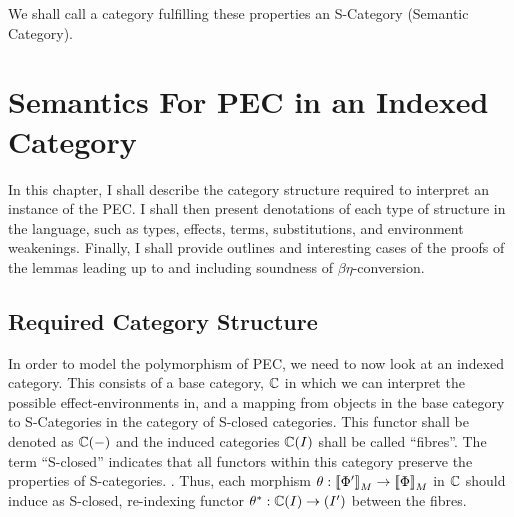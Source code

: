 \documentclass{Report}
\begin{document}
\qquad%

We shall call a category fulfilling these properties an S-Category (Semantic Category).


\chapter{Semantics For PEC in an Indexed Category}
In this chapter, I shall describe the category structure required to interpret an instance of the PEC. I shall then present denotations of each type of structure in the language, such as types, effects, terms, substitutions, and environment weakenings. Finally, I shall provide outlines and interesting cases of the proofs of the lemmas leading up to and including soundness of $\beta\eta$-conversion.


\section{Required Category Structure}
In order to model the polymorphism of PEC, we need to now look at an indexed category. This consists of a base category, $\mathbb{C}$ in which we can interpret the possible effect-environments in, and a mapping from objects in the base category to S-Categories in the category of S-closed categories. This functor shall be denoted as $\mathbb{C}(-)$ and the induced categories $\mathbb{C}(I)$ shall be called ``fibres''. The term ``S-closed'' indicates that all functors within this category preserve the properties of S-categories. . Thus, each morphism $\theta: {\bf [\![}\Phi'{\bf ]\!]}_M\rightarrow{\bf [\![}\Phi{\bf ]\!]}_M$ in $\mathbb{C}$ should induce as S-closed, re-indexing functor $\theta^*: \mathbb{C}(I)\rightarrow(I')$ between the fibres.
\end{document}
